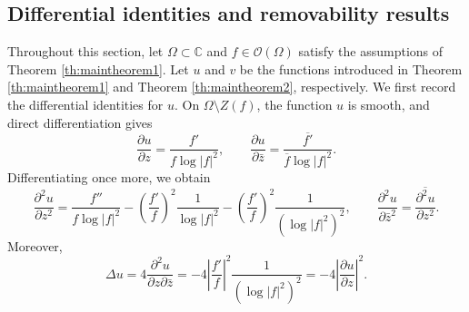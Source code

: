 \documentclass[12pt,twoside]{amsart}
\numberwithin{equation}{section}
\numberwithin{definition}{section} %
\begin{document}


\subsection{Differential identities and removability results}\label{Differential}


Throughout this section, let $\Omega \subset \mathbb{C}$ and $f \in \mathcal{O}(\Omega)$ satisfy the assumptions of Theorem \ref{th:maintheorem1}. Let $u$ and $v$ be the functions introduced in Theorem \ref{th:maintheorem1}  and Theorem \ref{th:maintheorem2}, respectively. We first record the differential identities for $u$. On $\Omega\setminus Z(f)$, the function $u$ is smooth, and direct
differentiation gives
\begin{equation}\label{eq:u-first-derivatives}
\frac{\partial u}{\partial z}
=\frac{f'}{f\log|f|^2},
\qquad
\frac{\partial u}{\partial\bar z}
=\frac{\overline{f'}}{\overline f\log|f|^2}.
\end{equation}
Differentiating once more, we obtain
\begin{equation}\label{eq:u-pure-second-derivative}
\frac{\partial^2u}{\partial z^2}
=
\frac{f''}{f\log|f|^2}
-\left(\frac{f'}f\right)^2\frac1{\log|f|^2}
-\left(\frac{f'}f\right)^2\frac1{(\log|f|^2)^2},
\qquad
\frac{\partial^2u}{\partial\bar z^2}
=\overline{\frac{\partial^2u}{\partial z^2}}.
\end{equation}
Moreover,
\begin{equation}\label{eq:u-laplacian}
\Delta u
=4\frac{\partial^2u}{\partial z\partial\bar z}
=-4\left|\frac{f'}f\right|^2\frac1{(\log|f|^2)^2}
=-4\left|\frac{\partial u}{\partial z}\right|^2.
\end{equation}
\end{document}
